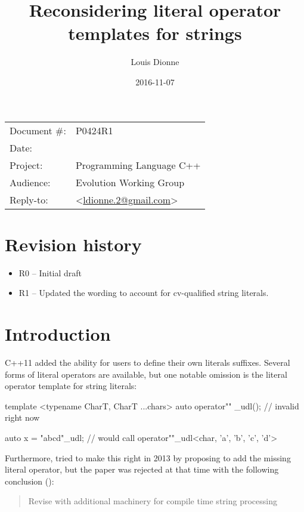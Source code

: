 \documentclass[11pt]{article}
\date{}
\title{Reconsidering literal operator templates for strings}
\author{}
\begin{document}
\maketitle\vspace{-2cm}

\begin{flushright}
  \begin{tabular}{ll}
  Document \#:&P0424R1\\
  Date:       &\date{2016-11-07}\\
  Project:    &Programming Language C++\\
  Audience:   &Evolution Working Group\\
  Reply-to:   &\author{Louis Dionne} \textless\href{mailto:ldionne.2@gmail.com}{ldionne.2@gmail.com}\textgreater
  \end{tabular}
\end{flushright}


\section{Revision history}
\begin{itemize}
  \item R0 -- Initial draft
  \item R1 -- Updated the wording to account for cv-qualified string literals.
\end{itemize}


\section{Introduction}
C++11 added the ability for users to define their own literals suffixes.
Several forms of literal operators are available, but one notable omission
is the literal operator template for string literals:

\begin{cpp}
template <typename CharT, CharT ...chars>
auto operator"" _udl(); // invalid right now

auto x = "abcd"_udl; // would call operator""_udl<char, 'a', 'b', 'c', 'd'>
\end{cpp}

Furthermore, \cite{N3599} tried to make this right in 2013 by proposing to add
the missing literal operator, but the paper was rejected at that time with
the following conclusion (\cite{CWG66}):

\begin{quote}
  Revise with additional machinery for compile time string processing
\end{quote}
\end{document}
